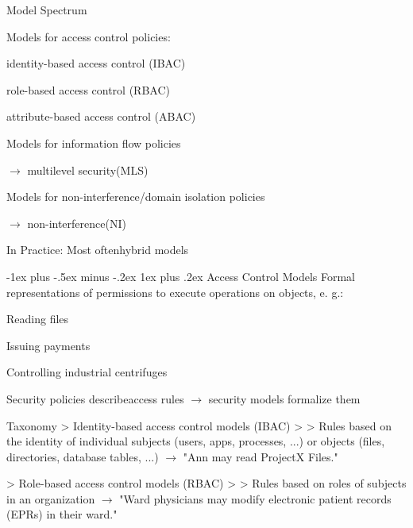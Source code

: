 \documentclass[a4paper]{article}
\makeatletter
\renewcommand{\subsubsection}{\@startsection{subsubsection}{3}{0mm}%
                                {-1ex plus -.5ex minus -.2ex}%
                                {1ex plus .2ex}%
                                {\normalfont\small\bfseries}}
\makeatother
\begin{document}
\begin{multicols}{3}
    Model Spectrum
    \begin{itemize*}
        \item Models for access control policies:
              \begin{itemize*}
                  \item identity-based access control (IBAC)
                  \item role-based access control (RBAC)
                  \item attribute-based access control (ABAC)
              \end{itemize*}
        \item Models for information flow policies
              \begin{itemize*}
                  \item $\rightarrow$ multilevel security(MLS)
              \end{itemize*}
        \item Models for non-interference/domain isolation policies
              \begin{itemize*}
                  \item $\rightarrow$ non-interference(NI)
              \end{itemize*}
        \item In Practice: Most oftenhybrid models
    \end{itemize*}


    \subsubsection{Access Control Models}
    Formal representations of permissions to execute operations on objects, e. g.:
    \begin{itemize*}
        \item Reading files
        \item Issuing payments
        \item Controlling industrial centrifuges
    \end{itemize*}
    Security policies describeaccess rules $\rightarrow$  security models formalize them

    Taxonomy
    > Identity-based access control models (IBAC)
    >
    > Rules based on the identity of individual subjects (users, apps, processes, ...) or objects (files, directories, database tables, ...) $\rightarrow$  "Ann may read ProjectX Files."

    > Role-based access control models (RBAC)
    >
    > Rules based on roles of subjects in an organization $\rightarrow$  "Ward physicians may modify electronic patient records (EPRs) in their ward."


\end{multicols}
\end{document}
